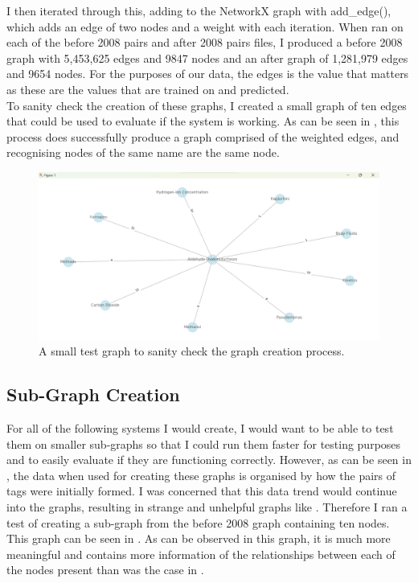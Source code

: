 \documentclass{l4proj}
\begin{document}
I then iterated through this, adding to the NetworkX graph with add\_edge(),  which adds an edge of two nodes and a weight with each iteration. When ran on each of the before 2008 pairs and after 2008 pairs files, I produced a before 2008 graph with 5,453,625 edges and 9847 nodes and an after graph of 1,281,979 edges and 9654 nodes. For the purposes of our data, the edges is the value that matters as these are the values that are trained on and predicted. \\

To sanity check the creation of these graphs, I created a small graph of ten edges that could be used to evaluate if the system is working. As can be seen in , this process does successfully produce a graph comprised of the weighted edges, and recognising nodes of the same name are the same node. \\

\begin{figure}[h]
    \centering
    \includegraphics[width=\linewidth]{images/test_graph_creation.png}
    \caption{A small test graph to sanity check the graph creation process.}
    \label{fig:test_graph_creation}
\end{figure}

\subsection{Sub-Graph Creation} 

For all of the following systems I would create, I would want to be able to test them on smaller sub-graphs so that I could run them faster for testing purposes and to easily evaluate if they are functioning correctly. However, as can be seen in , the data when used for creating these graphs is organised by how the pairs of tags were initially formed. I was concerned that this data trend would continue into the graphs, resulting in strange and unhelpful graphs like . Therefore I ran a test of creating a sub-graph from the before 2008 graph containing ten nodes. This graph can be seen in . As can be observed in this graph, it is much more meaningful and contains more information of the relationships between each of the nodes present than was the case in . \\
\end{document}
